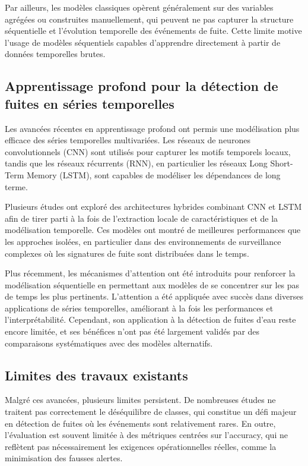 Par ailleurs, les modèles classiques opèrent généralement sur des variables
agrégées ou construites manuellement, qui peuvent ne pas capturer la structure
séquentielle et l'évolution temporelle des événements de fuite. Cette limite
motive l'usage de modèles séquentiels capables d'apprendre directement à partir
de données temporelles brutes.

\subsection{Apprentissage profond pour la détection de fuites en séries temporelles}

Les avancées récentes en apprentissage profond ont permis une modélisation plus
efficace des séries temporelles multivariées. Les réseaux de neurones
convolutionnels (CNN) sont utilisés pour capturer les motifs temporels locaux,
tandis que les réseaux récurrents (RNN), en particulier les réseaux Long
Short-Term Memory (LSTM), sont capables de modéliser les dépendances de long
terme.

Plusieurs études ont exploré des architectures hybrides combinant CNN et LSTM
afin de tirer parti à la fois de l'extraction locale de caractéristiques et de
la modélisation temporelle. Ces modèles ont montré de meilleures performances
que les approches isolées, en particulier dans des environnements de surveillance
complexes où les signatures de fuite sont distribuées dans le temps.

Plus récemment, les mécanismes d'attention ont été introduits pour renforcer la
modélisation séquentielle en permettant aux modèles de se concentrer sur les pas
de temps les plus pertinents. L'attention a été appliquée avec succès dans
diverses applications de séries temporelles, améliorant à la fois les
performances et l'interprétabilité. Cependant, son application à la détection
de fuites d'eau reste encore limitée, et ses bénéfices n'ont pas été largement
validés par des comparaisons systématiques avec des modèles alternatifs.

\subsection{Limites des travaux existants}

Malgré ces avancées, plusieurs limites persistent. De nombreuses études ne
traitent pas correctement le déséquilibre de classes, qui constitue un défi
majeur en détection de fuites où les événements sont relativement rares. En
outre, l'évaluation est souvent limitée à des métriques centrées sur l'accuracy,
qui ne reflètent pas nécessairement les exigences opérationnelles réelles,
comme la minimisation des fausses alertes.

